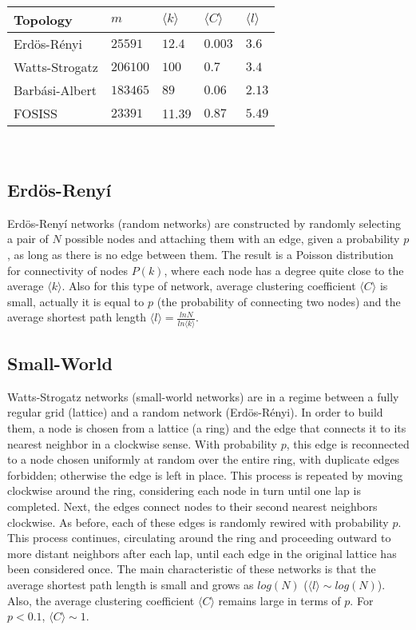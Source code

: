 \documentclass{bmcart}
\begin{document}
\begin{tabular}{| l |  l | l |l|l|}
\hline
\bf{Topology}       & $m$              & $\langle k \rangle$          & $\langle C \rangle$      & $\langle l \rangle$ \\ \hline
Erd\"{o}s-R\'enyi  &  $25591$      &  $12.4$        &  $0.003$ & $3.6$  \\ \hline
Watts-Strogatz    &  $206100$   &  $100$         &  $0.7$      & $3.4$  \\ \hline
Barb\'asi-Albert    &  $183465$   &  $89$           &  $0.06$    & $2.13$ \\ \hline
FOSISS                    &  $23391$     &   11.39     &  $0.87$    &  $5.49$ \\ \hline
\end{tabular}\\ 


\subsection*{Erd\"{o}s-Reny\'i}

Erd\"{o}s-Reny\'i networks \cite{ErdosRenyi:59} (random networks) are
constructed by randomly selecting a pair of $N$ possible nodes and
attaching them with an edge, given a probability $p$, as long as there
is no edge between them. The result is a Poisson distribution for
connectivity of nodes $P(k)$, where each node has a degree quite close
to the average $\langle k \rangle$. Also for this type of network,
average clustering coefficient $\langle C \rangle$ is small, actually
it is equal to $p$ (the probability of connecting two nodes) and the
average shortest path length
$\langle l \rangle = \frac{lnN}{ln\langle k \rangle}$.


\subsection*{Small-World}

Watts-Strogatz networks \cite{WattsStrogatz:98} (small-world networks)
are in a regime between a fully regular grid (lattice) and a random
network (Erd\"{o}s-R\'enyi). In order to build them, a node is chosen
from a lattice (a ring) and the edge that connects it to its nearest
neighbor in a clockwise sense. With probability $p$, this edge is
reconnected to a node chosen uniformly at random over the entire ring,
with duplicate edges forbidden; otherwise the edge is left in
place. This process is repeated by moving clockwise around the ring,
considering each node in turn until one lap is completed. Next, the
edges connect nodes to their second nearest neighbors clockwise. As
before, each of these edges is randomly rewired with probability
$p$. This process continues, circulating around the ring and
proceeding outward to more distant neighbors after each lap, until
each edge in the original lattice has been considered once. The main
characteristic of these networks is that the average shortest path
length is small and grows as $log(N)$
($\langle l \rangle \sim log(N)$). Also, the average clustering
coefficient $\langle C \rangle$ remains large in terms of $p$. For
$p < 0.1$, $\langle C \rangle \sim 1$.
\end{document}
